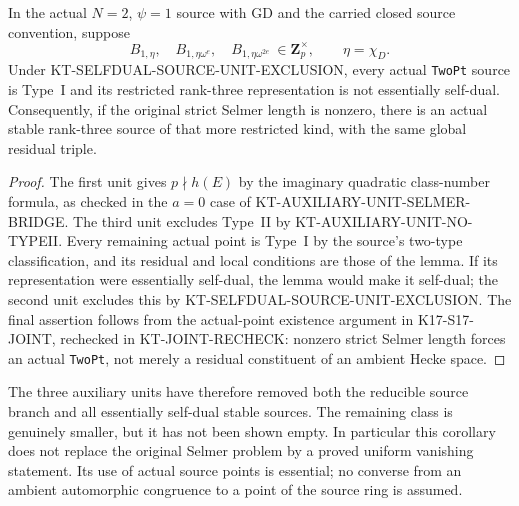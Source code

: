 \begin{corollary}
In the actual $N=2$, $\psi=1$ source with GD and the carried
closed source convention, suppose
\[
 B_{1,\eta},\quad B_{1,\eta\omega^e},\quad
 B_{1,\eta\omega^{2e}}\ \in\mathbf Z_p^\times,
 \qquad \eta=\chi_D.                                    \tag{ES.5}
\]
Under KT-SELFDUAL-SOURCE-UNIT-EXCLUSION, every actual
\texttt{TwoPt} source is Type~I and its restricted rank-three
representation is not essentially self-dual.
Consequently, if the original strict Selmer length is nonzero,
there is an actual stable rank-three source of that more
restricted kind, with the same global residual triple.
\end{corollary}

\begin{proof}
The first unit gives $p\nmid h(E)$ by the imaginary quadratic
class-number formula, as checked in the $a=0$ case of
KT-AUXILIARY-UNIT-SELMER-BRIDGE.
The third unit excludes Type~II by
KT-AUXILIARY-UNIT-NO-TYPEII.  Every remaining actual point
is Type~I by the source's two-type classification, and its
residual and local conditions are those of the lemma.
If its representation were essentially self-dual, the lemma
would make it self-dual; the second unit excludes this by
KT-SELFDUAL-SOURCE-UNIT-EXCLUSION.
The final assertion follows from the actual-point existence
argument in K17-S17-JOINT, rechecked in KT-JOINT-RECHECK:
nonzero strict Selmer length forces an actual \texttt{TwoPt},
not merely a residual constituent of an ambient Hecke space.
\end{proof}

The three auxiliary units have therefore removed both the
reducible source branch and all essentially self-dual stable
sources.  The remaining class is genuinely smaller, but it
has not been shown empty.  In particular this corollary does
not replace the original Selmer problem by a proved uniform
vanishing statement.  Its use of actual source points is
essential; no converse from an ambient automorphic congruence
to a point of the source ring is assumed.
